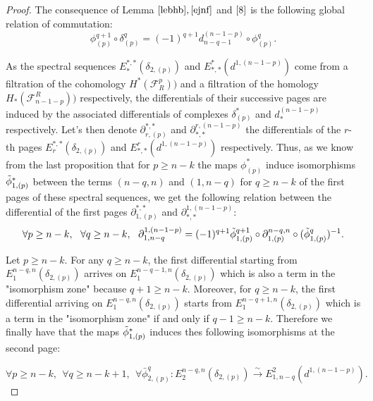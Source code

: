 \documentclass{article}
\begin{document}
\begin{proof}
    The consequence of Lemma $\ref{lebhb},\ref{ejnf}$ and $\ref{8}$ is the following global relation of commutation:
    \begin{equation*}
        \phi^{q+1}_{(p)} \circ \delta_{(p)}^q = (-1)^{q+1}d^{(n-1-p)}_{n-q-1} \circ \phi^q_{(p)}.
    \end{equation*}
    
    As the spectral sequences $E_*^{*,*}(\delta_{2,(p)})$ and $E^*_{*,*}(d^{1,(n-1-p)})$ come from a filtration of the cohomology $H^*(\mathcal{F}^p_R))$ and a filtration of the homology $H_*(\mathcal{F}_{n-1-p}^R))$ respectively, the differentials of their successive pages are induced by the associated differentials of complexes $\delta_{(p)}^*$ and $d^{(n-1-p)}_*$ respectively. Let's then denote $\partial_{r,(p)}^{*,*}$ and $\partial^{r,(n-1-p)}_{*,*}$ the differentials of the $r$-th pages $E_r^{*,*}(\delta_{2,(p)})$ and $E^r_{*,*}(d^{1,(n-1-p)})$ respectively. Thus, as we know from the last proposition that for $p \geq n-k$ the maps $\phi^*_{(p)}$ induce isomorphisms $\Tilde{\phi}^*_{1,(p)}$ between the terms $(n-q,n)$ and $(1,n-q)$ for $q\geq n-k$ of the first pages of these spectral sequences, we get the following relation between the differential of the first pages $\partial_{1,(p)}^{*,*}$ and $\partial^{1,(n-1-p)}_{*,*}$:
    \begin{equation*}
        \forall p \geq n-k,~~ \forall q \geq n-k,~~ \partial^{1,(n-1-p)}_{1,n-q} = (-1)^{q+1} \Tilde{\phi}^{q+1}_{1,(p)}\circ \partial_{1,(p)}^{n-q,n} \circ (\Tilde{\phi}^q_{1,(p)})^{-1}.
    \end{equation*}
    
    Let $p \geq n-k$. For any $q \geq n-k$, the first differential starting from $E_1^{n-q,n}(\delta_{2,(p)})$ arrives on $E_1^{n-q-1,n}(\delta_{2,(p)})$ which is also a term in the "isomorphism zone" because $q+1 \geq n-k$. Moreover, for $q \geq n-k$, the first differential arriving on $E_1^{n-q,n}(\delta_{2,(p)})$ starts from $E_1^{n-q+1,n}(\delta_{2,(p)})$ which is a term in the "isomorphism zone" if and only if $q-1\geq n-k$. Therefore we finally have that the maps $\Tilde{\phi}^*_{1,(p)}$ induces thes following isomorphisms at the second page:

    \begin{equation*}
        \forall p \geq n-k, ~~ \forall q \geq n-k+1,~~\forall\bar{\phi}^q_{2,(p)}: E_2^{n-q,n}(\delta_{2,(p)}) \xrightarrow{\sim} E^2_{1,n-q}(d^{1,(n-1-p)}).
    \end{equation*}
\end{proof}
\end{document}
